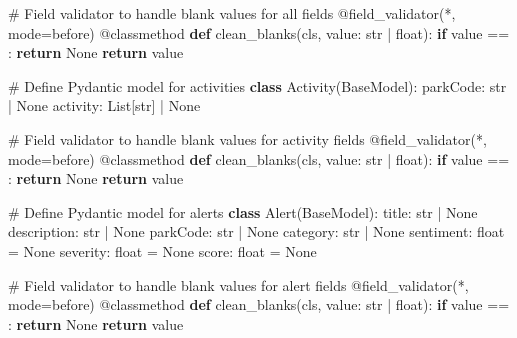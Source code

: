 \documentclass[
  letterpaper,
  DIV=11,
  numbers=noendperiod]{scrartcl}
\newenvironment{Shaded}{\begin{snugshade}}{\end{snugshade}}
\newcommand{\AttributeTok}[1]{\textcolor[rgb]{0.40,0.45,0.13}{#1}}
\newcommand{\BuiltInTok}[1]{\textcolor[rgb]{0.00,0.23,0.31}{#1}}
\newcommand{\CommentTok}[1]{\textcolor[rgb]{0.37,0.37,0.37}{#1}}
\newcommand{\ControlFlowTok}[1]{\textcolor[rgb]{0.00,0.23,0.31}{\textbf{#1}}}
\newcommand{\KeywordTok}[1]{\textcolor[rgb]{0.00,0.23,0.31}{\textbf{#1}}}
\newcommand{\NormalTok}[1]{\textcolor[rgb]{0.00,0.23,0.31}{#1}}
\newcommand{\OperatorTok}[1]{\textcolor[rgb]{0.37,0.37,0.37}{#1}}
\newcommand{\StringTok}[1]{\textcolor[rgb]{0.13,0.47,0.30}{#1}}
\newcommand{\VariableTok}[1]{\textcolor[rgb]{0.07,0.07,0.07}{#1}}
\begin{document}
\begin{Shaded}
\begin{Highlighting}[]
    \CommentTok{\# Field validator to handle blank values for all fields}
    \AttributeTok{@field\_validator}\NormalTok{(}\StringTok{\textquotesingle{}*\textquotesingle{}}\NormalTok{, mode}\OperatorTok{=}\StringTok{\textquotesingle{}before\textquotesingle{}}\NormalTok{)}
    \AttributeTok{@classmethod}
    \KeywordTok{def}\NormalTok{ clean\_blanks(cls, value: }\BuiltInTok{str} \OperatorTok{|} \BuiltInTok{float}\NormalTok{):}
        \ControlFlowTok{if}\NormalTok{ value }\OperatorTok{==} \StringTok{\textquotesingle{}\textquotesingle{}}\NormalTok{:}
            \ControlFlowTok{return} \VariableTok{None}
        \ControlFlowTok{return}\NormalTok{ value}

\CommentTok{\# Define Pydantic model for activities}
\KeywordTok{class}\NormalTok{ Activity(BaseModel):}
\NormalTok{    parkCode: }\BuiltInTok{str} \OperatorTok{|} \VariableTok{None}
\NormalTok{    activity: List[}\BuiltInTok{str}\NormalTok{] }\OperatorTok{|} \VariableTok{None}

    \CommentTok{\# Field validator to handle blank values for activity fields}
    \AttributeTok{@field\_validator}\NormalTok{(}\StringTok{\textquotesingle{}*\textquotesingle{}}\NormalTok{, mode}\OperatorTok{=}\StringTok{\textquotesingle{}before\textquotesingle{}}\NormalTok{)}
    \AttributeTok{@classmethod}
    \KeywordTok{def}\NormalTok{ clean\_blanks(cls, value: }\BuiltInTok{str} \OperatorTok{|} \BuiltInTok{float}\NormalTok{):}
        \ControlFlowTok{if}\NormalTok{ value }\OperatorTok{==} \StringTok{\textquotesingle{}\textquotesingle{}}\NormalTok{:}
            \ControlFlowTok{return} \VariableTok{None}
        \ControlFlowTok{return}\NormalTok{ value}

\CommentTok{\# Define Pydantic model for alerts}
\KeywordTok{class}\NormalTok{ Alert(BaseModel):}
\NormalTok{    title: }\BuiltInTok{str} \OperatorTok{|} \VariableTok{None}
\NormalTok{    description: }\BuiltInTok{str} \OperatorTok{|} \VariableTok{None}
\NormalTok{    parkCode: }\BuiltInTok{str} \OperatorTok{|} \VariableTok{None}
\NormalTok{    category: }\BuiltInTok{str} \OperatorTok{|} \VariableTok{None}
\NormalTok{    sentiment: }\BuiltInTok{float} \OperatorTok{=} \VariableTok{None}
\NormalTok{    severity: }\BuiltInTok{float} \OperatorTok{=} \VariableTok{None}
\NormalTok{    score: }\BuiltInTok{float} \OperatorTok{=} \VariableTok{None}

    \CommentTok{\# Field validator to handle blank values for alert fields}
    \AttributeTok{@field\_validator}\NormalTok{(}\StringTok{\textquotesingle{}*\textquotesingle{}}\NormalTok{, mode}\OperatorTok{=}\StringTok{\textquotesingle{}before\textquotesingle{}}\NormalTok{)}
    \AttributeTok{@classmethod}
    \KeywordTok{def}\NormalTok{ clean\_blanks(cls, value: }\BuiltInTok{str} \OperatorTok{|} \BuiltInTok{float}\NormalTok{):}
        \ControlFlowTok{if}\NormalTok{ value }\OperatorTok{==} \StringTok{\textquotesingle{}\textquotesingle{}}\NormalTok{:}
            \ControlFlowTok{return} \VariableTok{None}
        \ControlFlowTok{return}\NormalTok{ value}


\end{Highlighting}
\end{Shaded}
\end{document}
